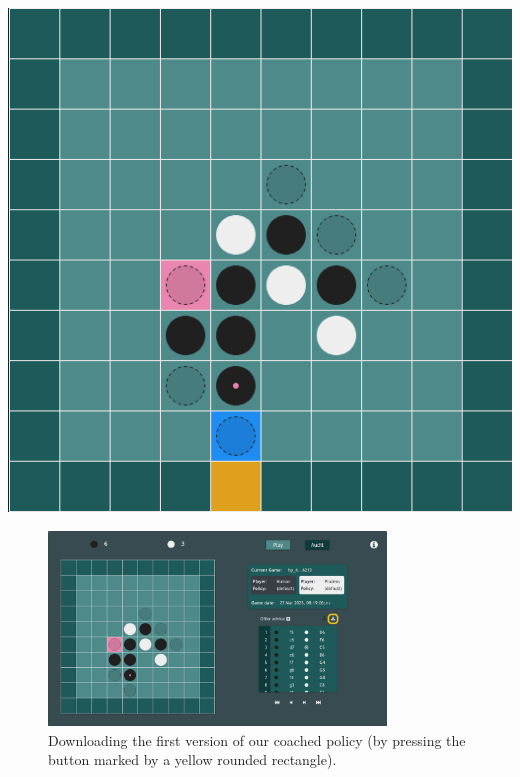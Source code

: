 \documentclass[a4paper,11pt]{article}
\theoremstyle{definition}
\theoremstyle{remark}
\numberwithin{equation}{section}
\begin{document}
	\begin{minipage}[c]{0.35\textwidth}
		\includegraphics[width = \textwidth]{../assets/advice_001.png}
		\label{fig:101}
	\end{minipage}

	\begin{figure}[!htb]
		\centering
		\includegraphics[width = 0.8\textwidth]{../assets/download_coached_policy.png}
		\caption{Downloading the first version of our coached policy (by pressing the button marked by a yellow rounded rectangle).}
		\label{fig:102}
	\end{figure}
\end{document}

